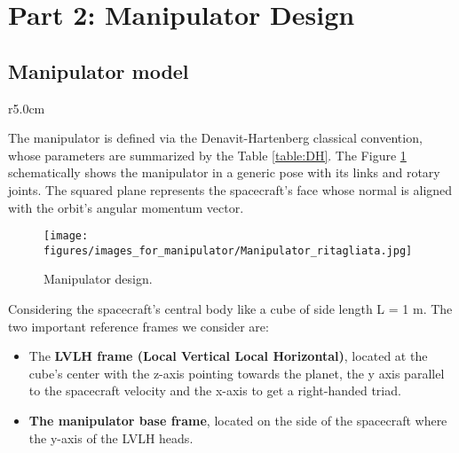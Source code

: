 \documentclass[main.tex]{subfiles}
\begin{document}
\section{Part 2: Manipulator Design}\label{sec:development}


\subsection{Manipulator model}

\begin{wraptable}{r}{5.0cm}
    \caption{\label{table:DH} DH table.}
   
\end{wraptable}

The manipulator is defined via the Denavit-Hartenberg classical convention, whose parameters are summarized by the Table \ref{table:DH}. The Figure \ref{fig:manipulator} schematically shows the manipulator in a generic pose with its links and rotary joints. The squared plane represents the spacecraft’s face whose normal is aligned with the orbit’s angular momentum vector.


\begin{figure}[!ht]
    \centering
        \texttt{[image: figures/images\_for\_manipulator/Manipulator\_ritagliata.jpg]}
        \caption{Manipulator design.}
        \label{fig:manipulator}
\end{figure}

Considering the spacecraft’s central body like a cube of side length L = 1 m. The two important reference frames we consider are:
\begin{itemize}
\item The \textbf{LVLH frame (Local Vertical Local Horizontal)}, located at the cube’s center with the z-axis pointing towards the planet, the y axis parallel to the spacecraft velocity and the x-axis to get a right-handed triad. 
\item \textbf{The manipulator base frame}, located on the side of the spacecraft where the y-axis of the LVLH heads. 
\end{itemize}
\end{document}
